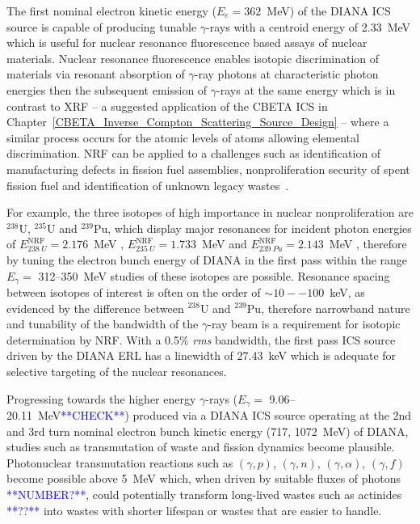 \documentclass[../main.tex]{subfiles}
\begin{document}
The first nominal electron kinetic energy ($E_{e} = 362$~\si{\mega\electronvolt}) of the DIANA ICS source is capable of producing tunable $\gamma$-rays with a centroid energy of 2.33~\si{\mega\electronvolt} which is useful for nuclear resonance fluorescence based assays of nuclear materials. Nuclear resonance fluorescence enables isotopic discrimination of materials via resonant absorption of $\gamma$-ray photons at characteristic photon energies then the subsequent emission of $\gamma$-rays at the same energy which is in contrast to XRF -- a suggested application of the CBETA ICS in Chapter~\ref{CBETA_Inverse_Compton_Scattering_Source_Design} -- where a similar process occurs for the atomic levels of atoms allowing elemental discrimination. NRF can be applied to a challenges such as identification of manufacturing defects in fission fuel assemblies, nonproliferation security of spent fission fuel and identification of unknown legacy wastes~\cite{angal2018perle,angell2015demonstration,bolind2015states,geddes2017impact,kwan2011discrete}.

For example, the three isotopes of high importance in nuclear nonproliferation are $^{238}\mathrm{U}$, $^{235}\mathrm{U}$ and $^{239}\mathrm{Pu}$, which display major resonances for incident photon energies of $E_{238~U}^{\mathrm{NRF}} = 2.176$~\si{\mega\electronvolt} \cite{quiter2011transmission},  $E_{235~U}^{\mathrm{NRF}} = 1.733$~\si{\mega\electronvolt} and  $E_{239~Pu}^{\mathrm{NRF}} = 2.143$~\si{\mega\electronvolt} \cite{hayakawa2010nondestructive}, therefore by tuning the electron bunch energy of DIANA in the first pass within the range $E_{\gamma} =$ 312--350~\si{\mega\electronvolt} studies of these isotopes are possible. Resonance spacing between isotopes of interest is often on the order of $\sim10--100$~\si{\kilo\electronvolt}, as evidenced by the difference between $^{238}\mathrm{U}$ and $^{239}\mathrm{Pu}$, therefore narrowband nature and tunability of the bandwidth of the $\gamma$-ray beam is a requirement for isotopic determination by NRF. With a 0.5\% \textit{rms} bandwidth, the first pass ICS source driven by the DIANA ERL has a linewidth of 27.43~\si{\kilo\electronvolt} which is adequate for selective targeting of the nuclear resonances.    

Progressing towards the higher energy $\gamma$-rays ($E_{\gamma} =$ 9.06--20.11~\si{\mega\electronvolt}\textcolor{blue}{**CHECK**}) produced via a DIANA ICS source operating at the 2nd and 3rd turn nominal electron bunch kinetic energy (717, 1072~\si{\mega\electronvolt}) of DIANA, studies such as transmutation of waste and fission dynamics become plausible. Photonuclear transmutation reactions such as $(\gamma,p)$, $(\gamma,n)$, $(\gamma,\alpha)$, $(\gamma,f)$ become possible above 5~\si{\mega\electronvolt} which, when driven by suitable fluxes of photons \textcolor{blue}{**NUMBER?**}, could potentially transform long-lived wastes such as actinides \textcolor{blue}{**??**} into wastes with shorter lifespan or wastes that are easier to handle. 
\end{document}
